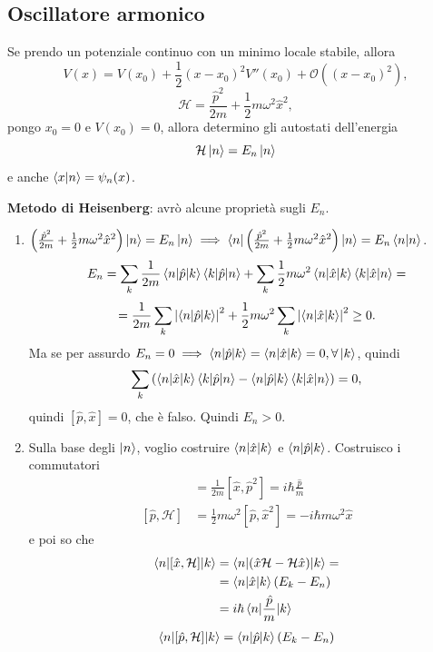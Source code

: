 \subsection{Oscillatore armonico}
Se prendo un potenziale continuo con un minimo locale stabile, allora
\[
V(x) = V(x_0) + \frac{1}{2}(x - x_0)^2 V''(x_0) + \mathcal{O}((x - x_0)^2),
\]
\[
\mathcal{H} = \frac{\hat{p}^2}{2m} + \frac{1}{2} m \omega^2 \hat{x}^2,
\]
pongo \( x_0 = 0 \) e \( V(x_0) = 0 \), allora determino gli autostati dell'energia
\[
\mathcal{H} \ket{n} = E_n \ket{n}
\]
e anche \( \braket{x|n} = \psi_n(x) \).

\bigskip
\noindent
\textbf{Metodo di Heisenberg}: avrò alcune proprietà sugli \( E_n \).
\begin{enumerate}
\item \( \left( \frac{\hat{p}^2}{2m} + \frac{1}{2} m \omega^2 \hat{x}^2 \right) \ket{n} = E_n \ket{n}  \implies \braket{n|\left( \frac{\hat{p}^2}{2m} + \frac{1}{2} m \omega^2 \hat{x}^2 \right)|n} = E_n \braket{n|n} \). 
\[
E_n = \sum_k \frac{1}{2m} \braket{n|\hat{p}|k} \braket{k|\hat{p}|n} + \sum_k \frac{1}{2} m \omega^2 \braket{n|\hat{x}|k} \braket{k|\hat{x}|n} =
\]
\[
= \frac{1}{2m} \sum_k \left| \braket{n|\hat{p}|k} \right|^2 + \frac{1}{2} m \omega^2 \sum_k \left| \braket{n|\hat{x}|k} \right|^2 \geq 0.
\]
Ma se per assurdo \( E_n = 0 \implies \braket{n|\hat{p}|k} = \braket{n|\hat{x}|k} = 0, \forall \ket{k} \), quindi
\[
\sum_k \left( \braket{n|\hat{x}|k} \braket{k|\hat{p}|n} - \braket{n|\hat{p}|k} \braket{k|\hat{x}|n} \right) = 0,
\]
quindi \( [\hat{p}, \hat{x}] = 0 \), che è falso. Quindi \( \boxed{E_n > 0} \).
\item Sulla base degli \( \ket{n} \), voglio costruire \( \braket{n|\hat{x}|k} \) e \( \braket{n|\hat{p}|k} \). Costruisco i commutatori
\begin{align*}
[\hat{x}, \mathcal{H}] &= \frac{1}{2m} [\hat{x}, \hat{p}^2] = i\hbar \frac{\hat{p}}{m} \\
[\hat{p}, \mathcal{H}] &= \frac{1}{2} m \omega^2 [\hat{p}, \hat{x}^2] = -i\hbar m \omega^2 \hat{x}
\end{align*}
e poi so che
\begin{align*}
\braket{n|[\hat{x}, \mathcal{H}]|k} &=  \braket{n|(\hat{x}\mathcal{H} - \mathcal{H}\hat{x})|k} = \\
&= \braket{n|\hat{x}|k}(E_k - E_n) \\
&= i\hbar \braket{n|\frac{\hat{p}}{m}|k}
\end{align*}
\begin{align*}
\braket{n|[\hat{p}, \mathcal{H}]|k} &= \braket{n|\hat{p}|k} (E_k - E_n) \\

\end{align*}
\end{enumerate}
